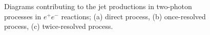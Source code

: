 \newpage

\begin{figure}[p]
\vskip 15cm
\caption{ \label{DIAGRAM}
Diagrams contributing to the jet productions
in two-photon processes in $e^+e^-$ reactions;
(a) direct process, (b) once-resolved process,
(c) twice-resolved process.}
\end{figure}






